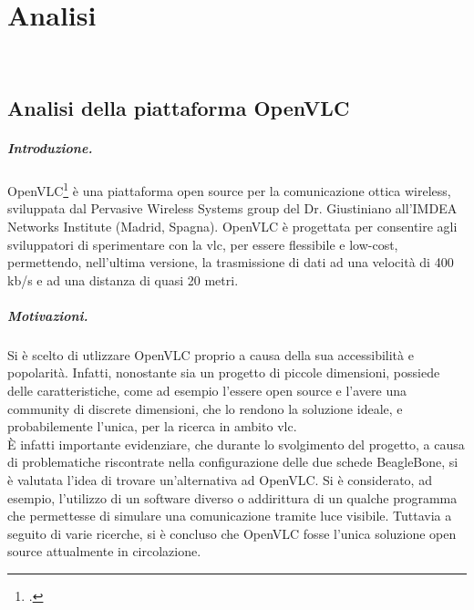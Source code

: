 \chapter{Analisi}
\label{cap:analisi}

\\

\section{Analisi della piattaforma OpenVLC}

\paragraph{Introduzione.}
OpenVLC\footcite{site:openvlc} è una piattaforma open source per la comunicazione ottica wireless, sviluppata dal Pervasive Wireless Systems group del Dr. Giustiniano all'IMDEA Networks Institute (Madrid, Spagna).
OpenVLC è progettata per consentire agli sviluppatori di sperimentare con la \gls{vlc}, per essere flessibile e low-cost, permettendo, nell'ultima versione, la trasmissione di dati ad una velocità di 400 kb/s e ad una distanza di quasi 20 metri.

\paragraph{Motivazioni.}
Si è scelto di utlizzare OpenVLC proprio a causa della sua accessibilità e popolarità. Infatti, nonostante sia un progetto di piccole dimensioni, possiede delle caratteristiche, come ad esempio l'essere open source e l'avere una community di discrete dimensioni, che lo rendono la soluzione ideale, e probabilemente l'unica, per la ricerca in ambito \gls{vlc}.\\
È infatti importante evidenziare, che durante lo svolgimento del progetto, a causa di problematiche riscontrate nella configurazione delle due schede BeagleBone, si è valutata l'idea di trovare un'alternativa ad OpenVLC. Si è considerato, ad esempio, l'utilizzo di un software diverso o addirittura di un qualche programma che permettesse di simulare una comunicazione tramite luce visibile. Tuttavia a seguito di varie ricerche, si è concluso che OpenVLC fosse l'unica soluzione open source attualmente in circolazione.

